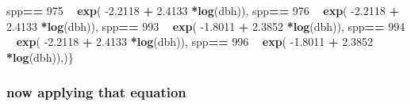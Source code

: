 \documentclass[
]{article}
\newenvironment{Shaded}{\begin{snugshade}}{\end{snugshade}}
\newcommand{\DecValTok}[1]{\textcolor[rgb]{0.00,0.00,0.81}{#1}}
\newcommand{\FloatTok}[1]{\textcolor[rgb]{0.00,0.00,0.81}{#1}}
\newcommand{\KeywordTok}[1]{\textcolor[rgb]{0.13,0.29,0.53}{\textbf{#1}}}
\newcommand{\NormalTok}[1]{#1}
\newcommand{\OperatorTok}[1]{\textcolor[rgb]{0.81,0.36,0.00}{\textbf{#1}}}
\newcommand{\StringTok}[1]{\textcolor[rgb]{0.31,0.60,0.02}{#1}}
\begin{document}
\begin{Shaded}
\begin{Highlighting}[]
\NormalTok{    spp}\OperatorTok{==}\StringTok{ }\DecValTok{975} \OperatorTok{~}\StringTok{ }\KeywordTok{exp}\NormalTok{( }\FloatTok{-2.2118}   \OperatorTok{+}\StringTok{    }\FloatTok{2.4133} \OperatorTok{*}\KeywordTok{log}\NormalTok{(dbh)),}
\NormalTok{    spp}\OperatorTok{==}\StringTok{ }\DecValTok{976} \OperatorTok{~}\StringTok{ }\KeywordTok{exp}\NormalTok{( }\FloatTok{-2.2118}   \OperatorTok{+}\StringTok{    }\FloatTok{2.4133} \OperatorTok{*}\KeywordTok{log}\NormalTok{(dbh)),}
\NormalTok{    spp}\OperatorTok{==}\StringTok{ }\DecValTok{993} \OperatorTok{~}\StringTok{ }\KeywordTok{exp}\NormalTok{( }\FloatTok{-1.8011}   \OperatorTok{+}\StringTok{    }\FloatTok{2.3852} \OperatorTok{*}\KeywordTok{log}\NormalTok{(dbh)),}
\NormalTok{    spp}\OperatorTok{==}\StringTok{ }\DecValTok{994} \OperatorTok{~}\StringTok{ }\KeywordTok{exp}\NormalTok{( }\FloatTok{-2.2118}   \OperatorTok{+}\StringTok{    }\FloatTok{2.4133} \OperatorTok{*}\KeywordTok{log}\NormalTok{(dbh)),}
\NormalTok{    spp}\OperatorTok{==}\StringTok{ }\DecValTok{996} \OperatorTok{~}\StringTok{ }\KeywordTok{exp}\NormalTok{( }\FloatTok{-1.8011}   \OperatorTok{+}\StringTok{    }\FloatTok{2.3852} \OperatorTok{*}\KeywordTok{log}\NormalTok{(dbh)),)\}}
\end{Highlighting}
\end{Shaded}

\hypertarget{now-applying-that-equation}{%
\subsubsection{now applying that
equation}\label{now-applying-that-equation}}
\end{document}
